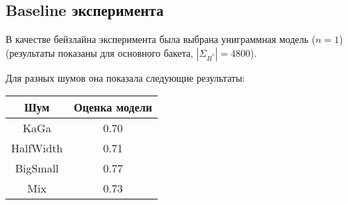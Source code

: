 \subsection{ Baseline эксперимента }

В качестве бейзлайна эксперимента была выбрана униграммная модель ($n = 1$) (результаты показаны для основного бакета, $|\Sigma_{B^*}| = 4800$).

Для разных шумов она показала следующие результаты:

\begin{tabular}{c|c}
	Шум 	& Оценка модели \\ \hline
	KaGa	& 0.70  \\
	HalfWidth &  0.71 \\
	BigSmall & 0.77  \\
	Mix 	&  0.73
\end{tabular}


